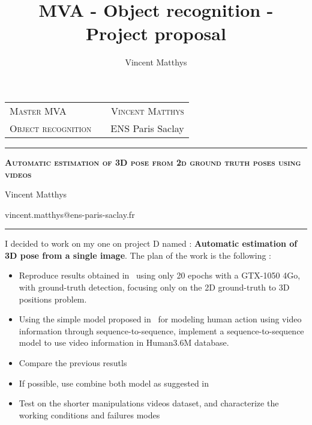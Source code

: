 \documentclass[12pt,a4paper,onecolumn]{article}
\title{MVA - Object recognition - Project proposal}
\author{Vincent Matthys}
\begin{document}
\begin{tabularx}{0.9\textwidth}{@{} l X r @{} }
	{\textsc{Master MVA}}       &  & \textsc{Vincent Matthys} \\
	\textsc{Object recognition} &  & {ENS Paris Saclay}       \\
\end{tabularx}
\vspace{1.5cm}
\begin{center}

	\rule[11pt]{5cm}{0.5pt}

	\textbf{\LARGE \textsc{Automatic estimation of 3D pose from 2d ground truth poses using videos}}
	\vspace{0.5cm}

	Vincent Matthys

	vincent.matthys@ens-paris-saclay.fr

	\rule{5cm}{0.5pt}

	\vspace{1.5cm}
\end{center}

I decided to work on my one on project D named : \textbf{Automatic estimation of 3D pose from a single image}.
The plan of the work is the following :
\begin{itemize}
	\item Reproduce results obtained in~\parencite{martinez2017simple} using only 20 epochs with a GTX-1050 4Go, with ground-truth detection, focusing only on the 2D ground-truth to 3D positions problem.
	\item Using the simple model proposed in~\parencite{martinez2017human} for modeling human action using video information through sequence-to-sequence, implement a sequence-to-sequence model to use video information in Human3.6M database.
	\item Compare the previous resutls
	\item If possible, use combine both model as suggested in~\parencite{hossain2017exploiting}
	\item Test on the shorter manipulations videos dataset, and characterize the working conditions and failures modes
\end{itemize}

\printbibliography
\end{document}
